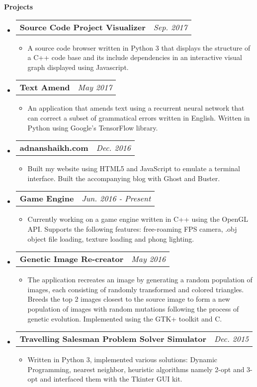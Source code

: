 \documentclass[letterpaper,12pt]{article}
\makeatletter
\newcommand{\resitem}[1]{\item #1 \vspace{-2pt}}
\newcommand{\resheading}[1]{{\large \colorbox{mygrey}{\begin{minipage}{\textwidth}{\textbf{#1 \vphantom{p\^{E}}}}\end{minipage}}}}
\newcommand{\resprojectsubheading}[2]{
  \begin{tabular*}{7.0in}{l@{\extracolsep{\fill}}r}
    \textbf{#1} & \textit{#2} \\
  \end{tabular*}\vspace{-6pt}}
\makeatother
\begin{document}
\resheading{Projects}
\begin{itemize}
\item
  \resprojectsubheading{Source Code Project Visualizer}{Sep. 2017}
  \begin{itemize}
    \resitem{A source code browser written in Python 3 that displays the structure of a C++ code base and its include dependencies in an interactive visual graph displayed using Javascript.}
  \end{itemize}
\item
  \resprojectsubheading{Text Amend}{May 2017}
  \begin{itemize}
    \resitem{An application that amends text using a recurrent neural network that can correct a subset of grammatical errors written in English. Written in Python using Google's TensorFlow library.}
  \end{itemize}
\item
  \resprojectsubheading{adnanshaikh.com}{Dec. 2016}
  \begin{itemize}
    \resitem{Built my website using HTML5 and JavaScript to emulate a terminal interface. Built the accompanying blog with Ghost and Buster.}
  \end{itemize}
\item
  \resprojectsubheading{Game Engine}{Jun. 2016 - Present}
  \begin{itemize}
    \resitem{Currently working on a game engine written in C++ using the OpenGL API. Supports the following features: free-roaming FPS camera, .obj object file loading, texture loading and phong lighting.}
  \end{itemize}
\item
  \resprojectsubheading{Genetic Image Re-creator}{May 2016}
  \begin{itemize}
    \resitem{The application recreates an image by generating a random population of images, each consisting of randomly transformed and colored triangles. Breeds the top 2 images closest to the source image to form a new population of images with random mutations following the process of genetic evolution. Implemented using the GTK+ toolkit and C.}
  \end{itemize}
\item
  \resprojectsubheading{Travelling Salesman Problem Solver Simulator}{Dec. 2015}
  \begin{itemize}
    \resitem{Written in Python 3, implemented various solutions: Dynamic Programming, nearest neighbor, heuristic algorithms namely 2-opt and 3-opt and interfaced them with the Tkinter GUI kit.}
  \end{itemize}
\end{itemize}
\end{document}
